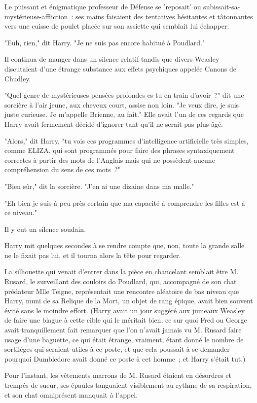 Le puissant et énigmatique professeur de Défense se 'reposait' ou subissait-sa-mystérieuse-affliction~: ses mains faisaient des tentatives hésitantes et tâtonnantes vers une cuisse de poulet placée sur son assiette qui semblait lui échapper.

"Euh, rien," dit Harry. "Je ne suis pas encore habitué à Poudlard."

Il continua de manger dans un silence relatif tandis que divers Weasley discutaient d'une étrange substance aux effets psychiques appelée Canons de Chudley.

"Quel genre de mystérieuses pensées profondes es-tu en train d'avoir~?" dit une sorcière à l'air jeune, aux cheveux court, assise non loin. "Je veux dire, je suis juste curieuse. Je m'appelle Brienne, au fait." Elle avait l'un de ces regards que Harry avait fermement décidé d'ignorer tant qu'il ne serait pas plus âgé.

"Alors," dit Harry, "tu vois ces programmes d'intelligence artificielle très simples, comme ELIZA, qui sont programmés pour faire des phrases syntaxiquement correctes à partir des mots de l'Anglais mais qui ne possèdent aucune compréhension du sens de ces mots~?"

"Bien sûr," dit la sorcière. "J'en ai une dizaine dans ma malle."

"Eh bien je suis à peu près certain que ma capacité à comprendre les filles est à ce niveau."

Il y eut un silence soudain.

Harry mit quelques secondes à se rendre compte que, non, toute la grande salle ne le fixait pas lui, et il tourna alors la tête pour regarder.

La silhouette qui venait d'entrer dans la pièce en chancelant semblait être M. Rusard, le surveillant des couloirs do Poudlard, qui, accompagné de son chat prédateur Mlle Teigne, représentait une rencontre aléatoire de bas niveau que Harry, muni de sa Relique de la Mort, un objet de rang épique, avait bien souvent évité sans le moindre effort. (Harry avait un jour suggéré aux jumeaux Weasley de faire une blague à cette cible qui le méritait bien, ce sur quoi Fred ou George avait tranquillement fait remarquer que l'on n'avait jamais vu M. Rusard faire usage d'une baguette, ce qui était étrange, vraiment, étant donné le nombre de sortilèges qui seraient utiles à ce poste, et que cela poussait à se demander pourquoi Dumbledore avait donné ce poste à cet homme~; et Harry s'était tut.)

Pour l'instant, les vêtements marrons de M. Rusard étaient en désordres et trempés de sueur, ses épaules tanguaient visiblement au rythme de sa respiration, et son chat omniprésent manquait à l'appel.

